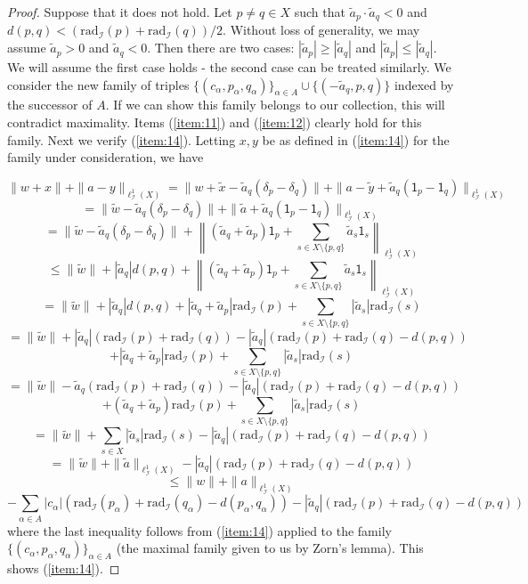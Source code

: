 \documentclass[12pt]{amsart}
\theoremstyle{definition}
\numberwithin{equation}{section}
\def \I {\mathcal{I}}
\def \one {\mathsf{1}}
\renewcommand{\l}[2]{\ell^1_{#1}\left( #2 \right)}
\newcommand{\rad}[2]{\mathrm{rad}_{#1}\left(#2\right)}
\begin{document}
\begin{proof}
Suppose that it does not hold. Let $p \neq q \in X$ such that $\tilde{a}_p \cdot \tilde{a}_q < 0$ and $d(p,q) < (\rad{\I}{p}+\rad{\I}{q})/2$. Without loss of generality, we may assume $\tilde{a}_p > 0$ and $\tilde{a}_q < 0$. Then there are two cases: $|\tilde{a}_p| \geq |\tilde{a}_q|$ and $|\tilde{a}_p| \leq |\tilde{a}_q|$. We will assume the first case holds - the second case can be treated similarly. We consider the new family of triples $\{(c_\alpha,p_\alpha,q_\alpha)\}_{\alpha \in A} \cup \{(-\tilde{a}_q,p,q)\}$ indexed by the successor of $A$. If we can show this family belongs to our collection, this will contradict maximality. Items (\ref{item:11}) and (\ref{item:12}) clearly hold for this family. Next we verify (\ref{item:14}). Letting $x,y$ be as defined in (\ref{item:14}) for the family under consideration, we have

$$\|w+x\| + \|a-y\|_{\l{\I}{X}} = \|w+\tilde{x}-\tilde{a}_q(\delta_p-\delta_q)\| + \|a-\tilde{y}+\tilde{a}_q(\one_p-\one_q)\|_{\l{\I}{X}}$$
$$= \|\tilde{w}-\tilde{a}_q(\delta_p-\delta_q)\| + \|\tilde{a}+\tilde{a}_q(\one_p-\one_q)\|_{\l{\I}{X}}$$
$$= \|\tilde{w}-\tilde{a}_q(\delta_p-\delta_q)\| + \left\|(\tilde{a}_q+\tilde{a}_p)\one_p+\sum_{s \in X \setminus \{p,q\}}\tilde{a}_s\one_s\right\|_{\l{\I}{X}}$$
$$\leq \|\tilde{w}\|+|\tilde{a}_q|d(p,q) + \left\|(\tilde{a}_q+\tilde{a}_p)\one_p+\sum_{s \in X \setminus \{p,q\}}\tilde{a}_s\one_s\right\|_{\l{\I}{X}}$$
$$= \|\tilde{w}\|+|\tilde{a}_q|d(p,q) + |\tilde{a}_q+\tilde{a}_p|\rad{\I}{p}+\sum_{s \in X \setminus \{p,q\}}|\tilde{a}_s|\rad{\I}{s}$$
$$= \|\tilde{w}\|+|\tilde{a}_q|(\rad{\I}{p}+\rad{\I}{q}) - |\tilde{a}_q|(\rad{\I}{p}+\rad{\I}{q}-d(p,q))$$
$$+ |\tilde{a}_q+\tilde{a}_p|\rad{\I}{p}+\sum_{s \in X \setminus \{p,q\}}|\tilde{a}_s|\rad{\I}{s}$$
$$= \|\tilde{w}\|-\tilde{a}_q(\rad{\I}{p}+\rad{\I}{q}) - |\tilde{a}_q|(\rad{\I}{p}+\rad{\I}{q}-d(p,q))$$
$$+ (\tilde{a}_q+\tilde{a}_p)\rad{\I}{p}+\sum_{s \in X \setminus \{p,q\}}|\tilde{a}_s|\rad{\I}{s}$$
$$= \|\tilde{w}\|+\sum_{s \in X}|\tilde{a}_s|\rad{\I}{s} - |\tilde{a}_q|(\rad{\I}{p}+\rad{\I}{q}-d(p,q))$$
$$= \|\tilde{w}\|+\|\tilde{a}\|_{\l{\I}{X}} - |\tilde{a}_q|(\rad{\I}{p}+\rad{\I}{q}-d(p,q))$$
$$\leq \|w\| + \|a\|_{\l{\I}{X}}$$
$$ - \sum_{\alpha \in A} |c_\alpha|(\rad{\I}{p_\alpha}+\rad{\I}{q_\alpha}-d(p_\alpha,q_\alpha)) - |\tilde{a}_q|(\rad{\I}{p}+\rad{\I}{q}-d(p,q))$$
where the last inequality follows from (\ref{item:14}) applied to the family $\{(c_\alpha,p_\alpha,q_\alpha)\}_{\alpha \in A}$ (the maximal family given to us by Zorn's lemma). This shows (\ref{item:14}).


\end{proof}
\end{document}
